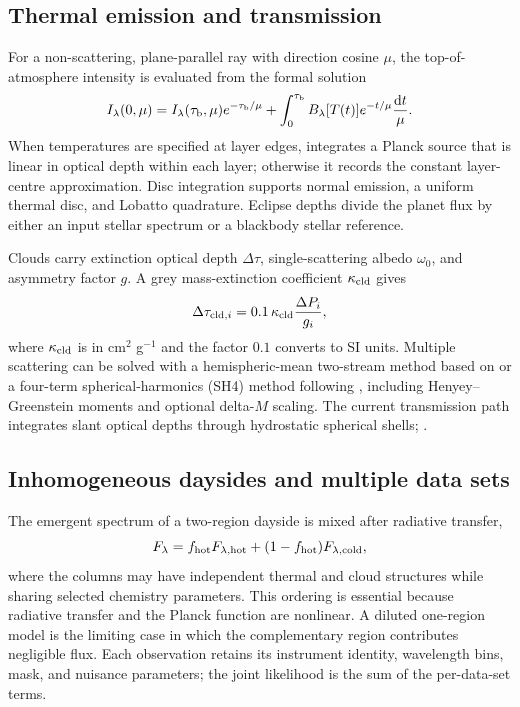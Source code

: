 \subsection{Thermal emission and transmission}

For a non-scattering, plane-parallel ray with direction cosine $\mu$, the
top-of-atmosphere intensity is evaluated from the formal solution
\begin{equation}
 I_{\lambda}(0,\mu) = I_{\lambda}(\tau_{\rm b},\mu)
 e^{-\tau_{\rm b}/\mu} +
 \int_{0}^{\tau_{\rm b}} B_{\lambda}[T(t)]
 e^{-t/\mu}\frac{\mathrm{d}t}{\mu}.
 \label{eq:formal}
\end{equation}
When temperatures are specified at layer edges, \ROBERT{} integrates a Planck
source that is linear in optical depth within each layer; otherwise it records
the constant layer-centre approximation. Disc integration supports normal
emission, a uniform thermal disc, and Lobatto quadrature. Eclipse depths divide
the planet flux by either an input stellar spectrum or a blackbody stellar
reference.

Clouds carry extinction optical depth $\Delta\tau$, single-scattering albedo
$\omega_0$, and asymmetry factor $g$. A grey mass-extinction coefficient
$\kappa_{\rm cld}$ gives
\begin{equation}
 \Delta\tau_{{\rm cld},i}=0.1\,
 \kappa_{\rm cld}\frac{\Delta P_i}{g_i},
 \label{eq:grey-cloud}
\end{equation}
where $\kappa_{\rm cld}$ is in cm$^2$ g$^{-1}$ and the factor $0.1$ converts to
SI units. Multiple scattering can be solved with a hemispheric-mean two-stream
method based on \citet{Toon1989} or a four-term spherical-harmonics (SH4)
method following \citet{Rooney2023}, including Henyey--Greenstein moments and
optional delta-$M$ scaling. The current transmission path integrates slant
optical depths through hydrostatic spherical shells; .

\subsection{Inhomogeneous daysides and multiple data sets}

The emergent spectrum of a two-region dayside is mixed after radiative transfer,
\begin{equation}
 F_{\lambda}=f_{\rm hot}F_{\lambda,\rm hot}+
 (1-f_{\rm hot})F_{\lambda,\rm cold},
 \label{eq:two-region}
\end{equation}
where the columns may have independent thermal and cloud structures while
sharing selected chemistry parameters. This ordering is essential because
radiative transfer and the Planck function are nonlinear. A diluted one-region
model is the limiting case in which the complementary region contributes
negligible flux. Each observation retains its instrument identity, wavelength
bins, mask, and nuisance parameters; the joint likelihood is the sum of the
per-data-set terms.

